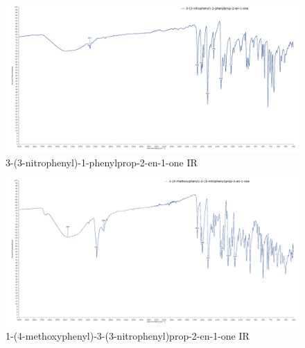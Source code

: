 \documentclass[11pt]{article}
\begin{document}
\newpage
\begin{figure}[H]
    \centering
    \includegraphics[scale=0.234]{spectra/ir7.1.png}
    \caption{3-(3-nitrophenyl)-1-phenylprop-2-en-1-one IR}
\end{figure}
\begin{figure}[H]
    \centering
    \includegraphics[scale=0.234]{spectra/ir7.2.png}
    \caption{1-(4-methoxyphenyl)-3-(3-nitrophenyl)prop-2-en-1-one IR}
\end{figure}
\end{document}
